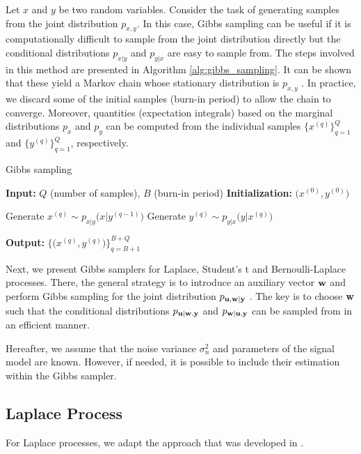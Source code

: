 \documentclass[journal]{IEEEtran}
\begin{document}
Let $x$ and $y$ be two random variables. Consider the task of generating samples from the joint distribution $p_{x, y}$. In this case, Gibbs sampling can be useful if it is computationally difficult to sample from the joint distribution directly but the conditional distributions $p_{x | y}$ and $p_{y |x}$ are easy to sample from. The steps involved in this method are presented in Algorithm \ref{alg:gibbs_sampling}. It can be shown that these yield a Markov chain whose stationary distribution is $p_{x, y}$ \cite{casella1992explaining}. In practice, we discard some of the initial samples (burn-in period) to allow the chain to converge. Moreover, quantities (expectation integrals) based on the marginal distributions $p_{x}$ and $p_{y}$ can be computed from the individual samples $\{x^{(q)}\}_{q=1}^{Q}$ and $\{y^{(q)}\}_{q=1}^{Q}$, respectively.  

\begin{algorithm}[t]
    \caption{Gibbs sampling}
    \begin{algorithmic}[1]
      \State \textbf{Input:} $Q$ (number of samples), $B$ (burn-in period)
      \State \textbf{Initialization:} $\big(x^{(0)}, y^{(0)}\big)$ 
      
        \State Generate $x^{(q)} \sim p_{x | y}\big(x | y^{(q-1)}\big)$
        \State Generate $y^{(q)} \sim p_{y | x}\big(y | x^{(q)}\big)$
      \EndFor

      \State \textbf{Output:} $\Big\{\big(x^{(q)}, y^{(q)}\big)\Big\}_{q=B+1}^{B+Q}$
    \end{algorithmic}
    \label{alg:gibbs_sampling}
  \end{algorithm}

Next, we present Gibbs samplers for Laplace, Student's t and Bernoulli-Laplace processes. There, the general strategy is to introduce an auxiliary vector ${\bf{w}}$ and perform Gibbs sampling for the joint distribution $p_{{\bf{u}}, {\bf{w}} | {\bf{y}}}$ \cite{tanner1987calculation,mira1997use}. The key is to choose ${\bf{w}}$ such that the conditional distributions $p_{{\bf{u}} | {\bf{w}}, {\bf{y}}}$ and $p_{{\bf{w}} | {\bf{u}}, {\bf{y}}}$ can be sampled from in an efficient manner. 

Hereafter, we assume that the noise variance $\sigma_{n}^{2}$ and parameters of the signal model are known. However, if needed, it is possible to include their estimation within the Gibbs sampler.
 

\subsection{Laplace Process}
For Laplace processes, we adapt the approach that was developed in \cite{park2008bayesian}.  
\end{document}
